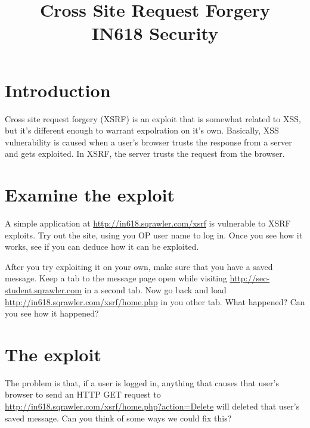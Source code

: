 \documentclass{article}
\begin{document}
\title{Cross Site Request Forgery\\ IN618 Security}
\date{}
\maketitle

\section*{Introduction}
Cross site request forgery (XSRF) is an exploit that is somewhat related to XSS,
but it's different enough to warrant expolration on it's own.  Basically,
XSS vulnerability is caused when a user's browser trusts the response from a
server and gets exploited.  In XSRF, the server trusts the request from the 
browser.

\section{Examine the exploit}
A simple application at \url{http://in618.sqrawler.com/xsrf} is vulnerable
to XSRF exploits. Try out the site, using you OP user name to log in. Once you
see how it works, see if you can deduce how it can be exploited. 

After you try exploiting it on your own, make sure that you have a saved 
message. Keep a tab to the message page open while visiting 
\url{http://sec-student.sqrawler.com} in a second tab.  Now go back
and load \url{http://in618.sqrawler.com/xsrf/home.php} in you other tab.
What happened?  Can you see how it happened?

\newpage

\section{The exploit}
The problem is that, if a user is logged in, anything that causes that user's
browser to send an HTTP GET request to \url{http://in618.sqrawler.com/xsrf/home.php?action=Delete} will deleted that user's saved message.  Can you think of some 
ways we could fix this?
\end{document}

